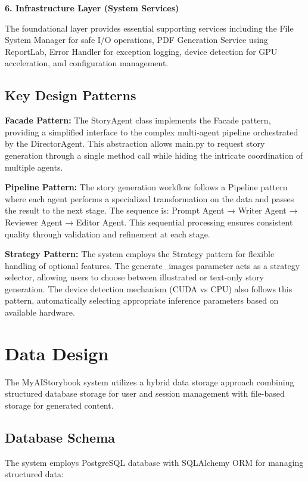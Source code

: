 \textbf{6. Infrastructure Layer (System Services)}

The foundational layer provides essential supporting services including the File System Manager for safe I/O operations, PDF Generation Service using ReportLab, Error Handler for exception logging, device detection for GPU acceleration, and configuration management.

\subsection{Key Design Patterns}

\textbf{Facade Pattern:} The StoryAgent class implements the Facade pattern, providing a simplified interface to the complex multi-agent pipeline orchestrated by the DirectorAgent. This abstraction allows main.py to request story generation through a single method call while hiding the intricate coordination of multiple agents.

\textbf{Pipeline Pattern:} The story generation workflow follows a Pipeline pattern where each agent performs a specialized transformation on the data and passes the result to the next stage. The sequence is: Prompt Agent → Writer Agent → Reviewer Agent → Editor Agent. This sequential processing ensures consistent quality through validation and refinement at each stage.

\textbf{Strategy Pattern:} The system employs the Strategy pattern for flexible handling of optional features. The generate\_images parameter acts as a strategy selector, allowing users to choose between illustrated or text-only story generation. The device detection mechanism (CUDA vs CPU) also follows this pattern, automatically selecting appropriate inference parameters based on available hardware.

\section{Data Design}

The MyAIStorybook system utilizes a hybrid data storage approach combining structured database storage for user and session management with file-based storage for generated content.

\subsection{Database Schema}

The system employs PostgreSQL database with SQLAlchemy ORM for managing structured data:

